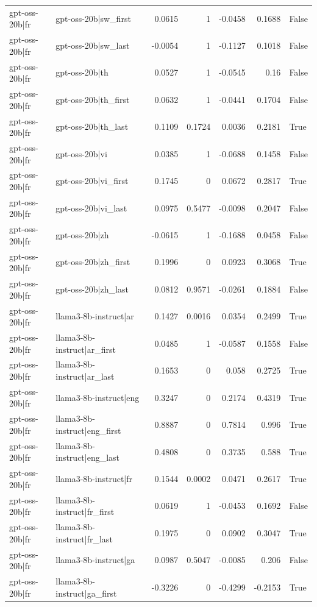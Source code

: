 \begin{table}
\begin{tabular}{l l r r r r l}
gpt-oss-20b|fr & gpt-oss-20b|sw_first & 0.0615 & 1 & -0.0458 & 0.1688 & False \\
gpt-oss-20b|fr & gpt-oss-20b|sw_last & -0.0054 & 1 & -0.1127 & 0.1018 & False \\
gpt-oss-20b|fr & gpt-oss-20b|th & 0.0527 & 1 & -0.0545 & 0.16 & False \\
gpt-oss-20b|fr & gpt-oss-20b|th_first & 0.0632 & 1 & -0.0441 & 0.1704 & False \\
gpt-oss-20b|fr & gpt-oss-20b|th_last & 0.1109 & 0.1724 & 0.0036 & 0.2181 & True \\
gpt-oss-20b|fr & gpt-oss-20b|vi & 0.0385 & 1 & -0.0688 & 0.1458 & False \\
gpt-oss-20b|fr & gpt-oss-20b|vi_first & 0.1745 & 0 & 0.0672 & 0.2817 & True \\
gpt-oss-20b|fr & gpt-oss-20b|vi_last & 0.0975 & 0.5477 & -0.0098 & 0.2047 & False \\
gpt-oss-20b|fr & gpt-oss-20b|zh & -0.0615 & 1 & -0.1688 & 0.0458 & False \\
gpt-oss-20b|fr & gpt-oss-20b|zh_first & 0.1996 & 0 & 0.0923 & 0.3068 & True \\
gpt-oss-20b|fr & gpt-oss-20b|zh_last & 0.0812 & 0.9571 & -0.0261 & 0.1884 & False \\
gpt-oss-20b|fr & llama3-8b-instruct|ar & 0.1427 & 0.0016 & 0.0354 & 0.2499 & True \\
gpt-oss-20b|fr & llama3-8b-instruct|ar_first & 0.0485 & 1 & -0.0587 & 0.1558 & False \\
gpt-oss-20b|fr & llama3-8b-instruct|ar_last & 0.1653 & 0 & 0.058 & 0.2725 & True \\
gpt-oss-20b|fr & llama3-8b-instruct|eng & 0.3247 & 0 & 0.2174 & 0.4319 & True \\
gpt-oss-20b|fr & llama3-8b-instruct|eng_first & 0.8887 & 0 & 0.7814 & 0.996 & True \\
gpt-oss-20b|fr & llama3-8b-instruct|eng_last & 0.4808 & 0 & 0.3735 & 0.588 & True \\
gpt-oss-20b|fr & llama3-8b-instruct|fr & 0.1544 & 0.0002 & 0.0471 & 0.2617 & True \\
gpt-oss-20b|fr & llama3-8b-instruct|fr_first & 0.0619 & 1 & -0.0453 & 0.1692 & False \\
gpt-oss-20b|fr & llama3-8b-instruct|fr_last & 0.1975 & 0 & 0.0902 & 0.3047 & True \\
gpt-oss-20b|fr & llama3-8b-instruct|ga & 0.0987 & 0.5047 & -0.0085 & 0.206 & False \\
gpt-oss-20b|fr & llama3-8b-instruct|ga_first & -0.3226 & 0 & -0.4299 & -0.2153 & True \\

\end{tabular}
\end{table}
